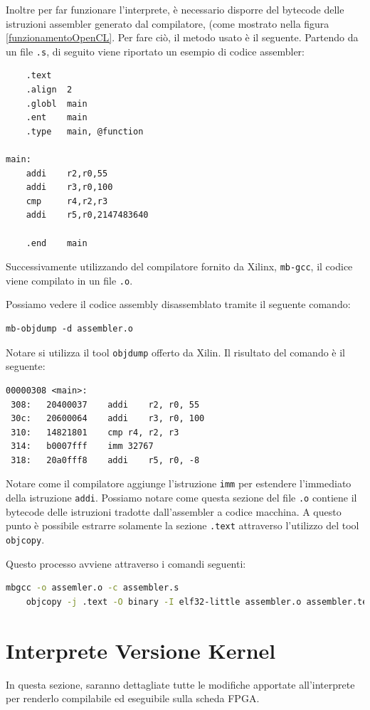 Inoltre per far funzionare l'interprete, è necessario disporre del bytecode delle istruzioni assembler generato dal compilatore, (come mostrato nella figura \ref{funzionamentoOpenCL}.
Per fare ciò, il metodo usato è il seguente. 
Partendo da un file \texttt{.s}, di seguito viene riportato un esempio di codice assembler:

\begin{lstlisting}
	.text
	.align	2
	.globl	main
	.ent	main
	.type	main, @function  

main:
	addi	r2,r0,55 
	addi	r3,r0,100
	cmp     r4,r2,r3 
	addi	r5,r0,2147483640
	
	.end	main
\end{lstlisting}
Successivamente utilizzando del compilatore fornito da Xilinx, \texttt{mb-gcc}, il codice viene compilato in un file \texttt{.o}.

\vspace{0.3cm}

\noindent Possiamo vedere il codice assembly disassemblato tramite il seguente comando: 

\begin{lstlisting}
mb-objdump -d assembler.o
\end{lstlisting}
Notare si utilizza il tool \texttt{objdump} offerto da Xilin. Il risultato del comando è il seguente:

\begin{lstlisting}
00000308 <main>:
 308:	20400037 	addi	r2, r0, 55
 30c:	20600064 	addi	r3, r0, 100
 310:	14821801 	cmp	r4, r2, r3
 314:	b0007fff 	imm	32767
 318:	20a0fff8 	addi	r5, r0, -8
\end{lstlisting}
Notare come il compilatore aggiunge l'istruzione \texttt{imm} per estendere l'immediato della istruzione \texttt{addi}. 
Possiamo notare come questa sezione del file \texttt{.o} contiene il bytecode delle istruzioni tradotte dall'assembler a codice macchina.
A questo punto è possibile estrarre solamente la sezione \texttt{.text} attraverso l'utilizzo del tool \texttt{objcopy}. 

\vspace{0.3cm}

\noindent Questo processo avviene attraverso i comandi seguenti:
\begin{lstlisting}[language=Bash]
	mbgcc -o assemler.o -c assembler.s 
	objcopy -j .text -O binary -I elf32-little assembler.o assembler.text  
\end{lstlisting}
\label{estrazioneBytecode}

\section{Interprete Versione Kernel}
\label{Interprete Kernel}
In questa sezione, saranno dettagliate tutte le modifiche apportate all'interprete per renderlo compilabile ed eseguibile sulla scheda FPGA. 

